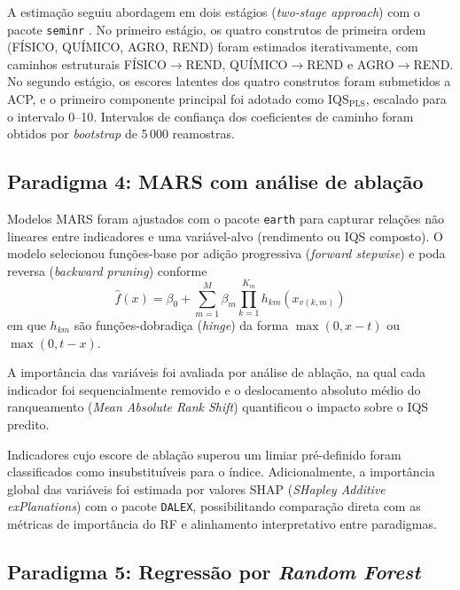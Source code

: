 \documentclass[pdflatex,sn-basic]{sn-jnl}%
\begin{document}
A estimação seguiu abordagem em dois estágios (\textit{two-stage approach}) com o pacote \texttt{seminr} \cite{Ray2022}. No primeiro estágio, os quatro construtos de primeira ordem (FÍSICO, QUÍMICO, AGRO, REND) foram estimados iterativamente, com caminhos estruturais FÍSICO$\to$REND, QUÍMICO$\to$REND e AGRO$\to$REND. No segundo estágio, os escores latentes dos quatro construtos foram submetidos a ACP, e o primeiro componente principal foi adotado como IQS$_{\text{PLS}}$, escalado para o intervalo 0--10. Intervalos de confiança dos coeficientes de caminho foram obtidos por \textit{bootstrap} de 5\,000 reamostras.

\subsection{Paradigma 4: MARS com análise de ablação}\label{subsec:mars}

Modelos MARS foram ajustados com o pacote \texttt{earth} \cite{Milborrow2023} para capturar relações não lineares entre indicadores e uma variável-alvo (rendimento ou IQS composto). O modelo selecionou funções-base por adição progressiva (\textit{forward stepwise}) e poda reversa (\textit{backward pruning}) conforme
\begin{equation}
\hat{f}(x) = \beta_0 + \sum_{m=1}^{M} \beta_m \prod_{k=1}^{K_m} h_{km}(x_{v(k,m)})
\label{eq:mars}
\end{equation}
em que $h_{km}$ são funções-dobradiça (\textit{hinge}) da forma $\max(0, x - t)$ ou $\max(0, t - x)$.

A importância das variáveis foi avaliada por análise de ablação, na qual cada indicador foi sequencialmente removido e o deslocamento absoluto médio do ranqueamento (\textit{Mean Absolute Rank Shift}) quantificou o impacto sobre o IQS predito. 

Indicadores cujo escore de ablação superou um limiar pré-definido foram classificados como insubstituíveis para o índice. Adicionalmente, a importância global das variáveis foi estimada por valores SHAP (\textit{SHapley Additive exPlanations}) com o pacote \texttt{DALEX}, possibilitando comparação direta com as métricas de importância do RF e alinhamento interpretativo entre paradigmas.

\subsection{Paradigma 5: Regressão por \textit{Random Forest}}\label{subsec:rf}
\end{document}
